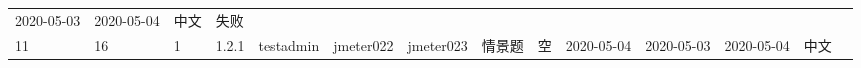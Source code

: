\documentclass[hyperref, a4paper]{ctexart}
\begin{document}
\begin{longtable}[]{@{}llllllllllllll@{}}
\begin{minipage}[t]{0.07\columnwidth}
2020-05-03\strut
\end{minipage} & \begin{minipage}[t]{0.08\columnwidth}\raggedright
2020-05-04\strut
\end{minipage} & \begin{minipage}[t]{0.04\columnwidth}\raggedright
中文\strut
\end{minipage} & \begin{minipage}[t]{0.02\columnwidth}\raggedright
失败\strut
\end{minipage}\tabularnewline
\begin{minipage}[t]{0.01\columnwidth}\raggedright
11\strut
\end{minipage} & \begin{minipage}[t]{0.12\columnwidth}\raggedright
16\strut
\end{minipage} & \begin{minipage}[t]{0.03\columnwidth}\raggedright
1\strut
\end{minipage} & \begin{minipage}[t]{0.06\columnwidth}\raggedright
1.2.1\strut
\end{minipage} & \begin{minipage}[t]{0.04\columnwidth}\raggedright
testadmin\strut
\end{minipage} & \begin{minipage}[t]{0.04\columnwidth}\raggedright
jmeter022\strut
\end{minipage} & \begin{minipage}[t]{0.04\columnwidth}\raggedright
jmeter023\strut
\end{minipage} & \begin{minipage}[t]{0.02\columnwidth}\raggedright
情景题\strut
\end{minipage} & \begin{minipage}[t]{0.04\columnwidth}\raggedright
空\strut
\end{minipage} & \begin{minipage}[t]{0.05\columnwidth}\raggedright
2020-05-04\strut
\end{minipage} & \begin{minipage}[t]{0.07\columnwidth}\raggedright
2020-05-03\strut
\end{minipage} & \begin{minipage}[t]{0.08\columnwidth}\raggedright
2020-05-04\strut
\end{minipage} & \begin{minipage}[t]{0.04\columnwidth}\raggedright
中文\strut
\end{minipage} & \begin{minipage}[t]{0.02\columnwidth}\raggedright

\end{minipage}
\end{longtable}
\end{document}
